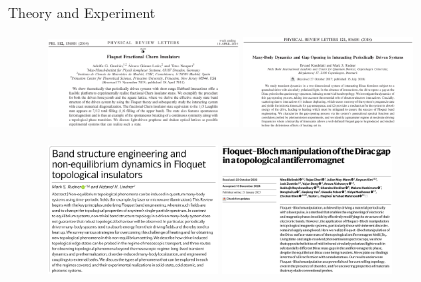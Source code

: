 \documentclass[xcolor=dvipsnames,10pt,aspectratio=169]{beamer}
\begin{document}
  \begin{frame}{Theory and Experiment}

    \begin{figure}
      \includegraphics[width=0.45\textwidth]{./figures/grushin.png}
      \includegraphics[width=0.40\textwidth]{./figures/kandelaki.png}
    \end{figure}
      \vspace{1em}
    \begin{figure}
      \includegraphics[width=0.40\textwidth]{./figures/rudner.png}
      \includegraphics[width=0.40\textwidth]{./figures/bielinski.png}
    \end{figure}

  \end{frame}
\end{document}
